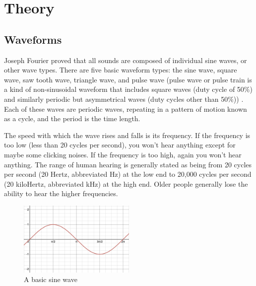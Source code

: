 \chapter[Theory]{Theory}\label{chapter:theory}

\section{Waveforms}\label{section:waveforms}
Joseph Fourier proved that all sounds are composed of individual sine waves, or other wave types. There are five basic waveform types: the sine wave, square wave, saw tooth wave, triangle wave, and pulse wave \cite{Winer_2018} (pulse wave or pulse train is a kind of non-sinusoidal waveform that includes square waves (duty cycle of 50\%) and similarly periodic but asymmetrical waves (duty cycles other than 50\%)) . Each of these waves are periodic waves, repeating in a pattern of motion known as a cycle, and the period is the time length. %

The speed with which the wave rises and falls is its frequency. If the frequency is too low (less than 20 cycles per second), you won’t hear anything except for maybe some clicking noises. If the frequency is too high, again you won’t hear anything. The range of human hearing is generally stated as being from 20 cycles per second (20 Hertz, abbreviated Hz) at the low end to 20,000 cycles per second (20 kiloHertz, abbreviated kHz) at the high end. Older people generally lose the ability to hear the higher frequencies.

\begin{figure}
	\centering
	\includegraphics[width=0.5\textwidth]{figures/sine-wave-form.png}
	\caption{A basic sine wave}
	\label{fig:basic-sine-wave}
\end{figure}

